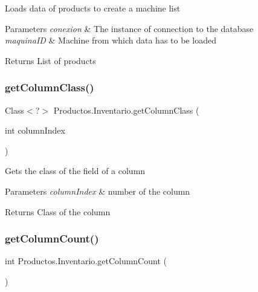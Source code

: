 Loads data of products to create a machine list 
\begin{DoxyParams}{Parameters}
{\em conexion} & The instance of connection to the database \\
\hline
{\em maquina\+ID} & Machine from which data has to be loaded \\
\hline
\end{DoxyParams}
\begin{DoxyReturn}{Returns}
List of products 
\end{DoxyReturn}
\mbox{\label{class_productos_1_1_inventario_a7292cea9b1726ac1635a202f3528886e}} 
\subsubsection{\texorpdfstring{get\+Column\+Class()}{getColumnClass()}}
{\footnotesize\ttfamily Class$<$?$>$ Productos.\+Inventario.\+get\+Column\+Class (\begin{DoxyParamCaption}\item[{int}]{column\+Index }\end{DoxyParamCaption})\hspace{0.3cm}{\ttfamily [inline]}}

Gets the class of the field of a column 
\begin{DoxyParams}{Parameters}
{\em column\+Index} & number of the column \\
\hline
\end{DoxyParams}
\begin{DoxyReturn}{Returns}
Class of the column 
\end{DoxyReturn}
\mbox{\label{class_productos_1_1_inventario_a0e88d355b4149cf548ae1cf27e5c342c}} 
\subsubsection{\texorpdfstring{get\+Column\+Count()}{getColumnCount()}}
{\footnotesize\ttfamily int Productos.\+Inventario.\+get\+Column\+Count (\begin{DoxyParamCaption}{ }\end{DoxyParamCaption})\hspace{0.3cm}{\ttfamily [inline]}}


